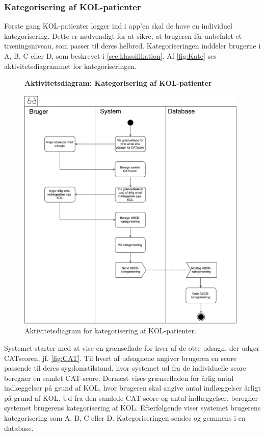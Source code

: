 \subsubsection*{Kategorisering af KOL-patienter} \label{sec:kategorisering}
Første gang KOL-patienter logger ind i app'en skal de have en individuel kategorisering. Dette er nødvendigt for at sikre, at brugeren får anbefalet et træningsniveau, som passer til deres helbred.
Kategoriseringen inddeler brugerne i A, B, C eller D, som beskrevet i \autoref{sec:klassifikation}. Af \autoref{fig:Kate} ses aktivitetsdiagrammet for kategoriseringen.

\begin{figure} [H]
\centering
\textbf{Aktivitetsdiagram: Kategorisering af KOL-patienter}\par\medskip
\includegraphics[width=0.98\textwidth]{figures/aktivitetsdiagram/Kategorisering}
\caption{Aktivitetsdiagram for kategorisering af KOL-patienter.}
\label{fig:Kate}
\end{figure}

\noindent
Systemet starter med at vise en grænseflade for hver af de otte udsagn, der udgør CATscoren, jf. \autoref{fig:CAT}. Til hvert af udsagnene angiver brugeren en score passende til deres sygdomstilstand, hvor systemet ud fra de individuelle score beregner en samlet CAT-score. 
Dernæst vises grænsefladen for årlig antal indlæggelser på grund af KOL, hvor brugeren skal angive antal indlæggelser årligt på grund af KOL. Ud fra den samlede CAT-score og antal indlæggelser, beregner systemet brugerens kategorisering af KOL. Efterfølgende viser systemet brugerens kategorisering som  A, B, C eller D.
Kategoriseringen sendes og gemmens i en database. 